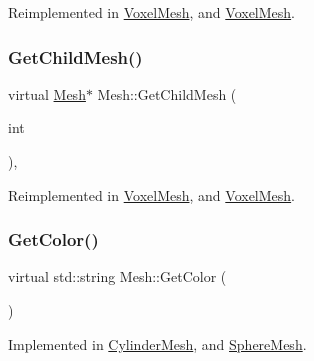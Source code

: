 Reimplemented in \mbox{\hyperlink{class_voxel_mesh_add1b9e40018be0b534747a6addee981d}{Voxel\+Mesh}}, and \mbox{\hyperlink{class_voxel_mesh_ad8ef76698c07a4531ccdf7de9408f903}{Voxel\+Mesh}}.

\mbox{\label{class_mesh_a6a97fe50af0e6b5bca76a15f73bbc1c0}} 
\subsubsection{\texorpdfstring{GetChildMesh()}{GetChildMesh()}\hspace{0.1cm}{\footnotesize\ttfamily [2/2]}}
{\footnotesize\ttfamily virtual \mbox{\hyperlink{class_mesh}{Mesh}}$\ast$ Mesh\+::\+Get\+Child\+Mesh (\begin{DoxyParamCaption}\item[{int}]{ }\end{DoxyParamCaption})\hspace{0.3cm}{\ttfamily [inline]}, {\ttfamily [virtual]}}



Reimplemented in \mbox{\hyperlink{class_voxel_mesh_add1b9e40018be0b534747a6addee981d}{Voxel\+Mesh}}, and \mbox{\hyperlink{class_voxel_mesh_ad8ef76698c07a4531ccdf7de9408f903}{Voxel\+Mesh}}.

\mbox{\label{class_mesh_aa413c0ccbc081aa50a2946e1c6930b0c}} 
\subsubsection{\texorpdfstring{GetColor()}{GetColor()}}
{\footnotesize\ttfamily virtual std\+::string Mesh\+::\+Get\+Color (\begin{DoxyParamCaption}{ }\end{DoxyParamCaption})\hspace{0.3cm}{\ttfamily [pure virtual]}}



Implemented in \mbox{\hyperlink{class_cylinder_mesh_a7415f90e56862321e09bcf6088a335a0}{Cylinder\+Mesh}}, and \mbox{\hyperlink{class_sphere_mesh_a1c490b89552f51b7960dc760ac09edf8}{Sphere\+Mesh}}.

\mbox{\label{class_mesh_ac9a0bc76a4e34c3985cbc4c20692c7df}} 
